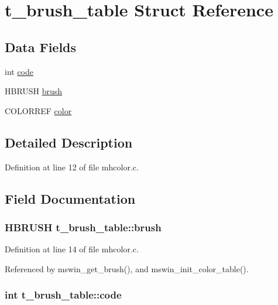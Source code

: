 \hypertarget{structt__brush__table}{\section{t\+\_\+brush\+\_\+table Struct Reference}
\label{structt__brush__table}
}
\subsection*{Data Fields}
\begin{DoxyCompactItemize}
\item 
int \hyperlink{structt__brush__table_a57770913705596d7bcb667c615c7878b}{code}
\item 
H\+B\+R\+U\+S\+H \hyperlink{structt__brush__table_aa0982ae9a552ca5a5ee7fee393231b8c}{brush}
\item 
C\+O\+L\+O\+R\+R\+E\+F \hyperlink{structt__brush__table_abd455fee406789caa678d28bd5452914}{color}
\end{DoxyCompactItemize}


\subsection{Detailed Description}


Definition at line 12 of file mhcolor.\+c.



\subsection{Field Documentation}
\hypertarget{structt__brush__table_aa0982ae9a552ca5a5ee7fee393231b8c}{
\subsubsection[{brush}]{\setlength{\rightskip}{0pt plus 5cm}H\+B\+R\+U\+S\+H t\+\_\+brush\+\_\+table\+::brush}}\label{structt__brush__table_aa0982ae9a552ca5a5ee7fee393231b8c}


Definition at line 14 of file mhcolor.\+c.



Referenced by mswin\+\_\+get\+\_\+brush(), and mswin\+\_\+init\+\_\+color\+\_\+table().

\hypertarget{structt__brush__table_a57770913705596d7bcb667c615c7878b}{
\subsubsection[{code}]{\setlength{\rightskip}{0pt plus 5cm}int t\+\_\+brush\+\_\+table\+::code}}\label{structt__brush__table_a57770913705596d7bcb667c615c7878b}


